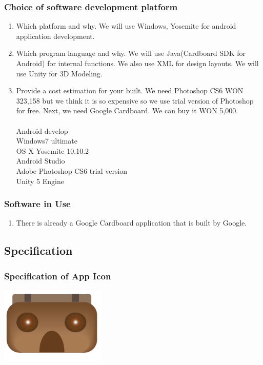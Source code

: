 \documentclass[12pt]{article}
\begin{document}

\subsubsection{Choice of software development platform}
\begin{enumerate}
\item Which platform and why. We will use Windows, Yosemite for android application development.
\item Which  program language and why. We will use Java(Cardboard SDK for Android) for internal functions. We also use XML for design layouts. We will use Unity for 3D Modeling.
\item Provide a cost estimation for your built. We need Photoshop CS6 WON 323,158  but we think it is so expensive so we use trial version of Photoshop for free. Next, we need Google Cardboard. We can buy it WON 5,000.\\ \\
Android develop\\
Windows7 ultimate\\
OS X Yosemite 10.10.2\\
Android Studio\\
Adobe Photoshop CS6 trial version\\
Unity 5 Engine\\
\end{enumerate}

\subsubsection{Software in Use}
\begin{enumerate}
\item There is already a Google Cardboard application that is built by Google.
\end{enumerate}


\subsection{Specification}


\subsubsection{Specification of App Icon}
\includegraphics[width=50mm,scale=0.5]{HeadScope_APP}
\end{document}
